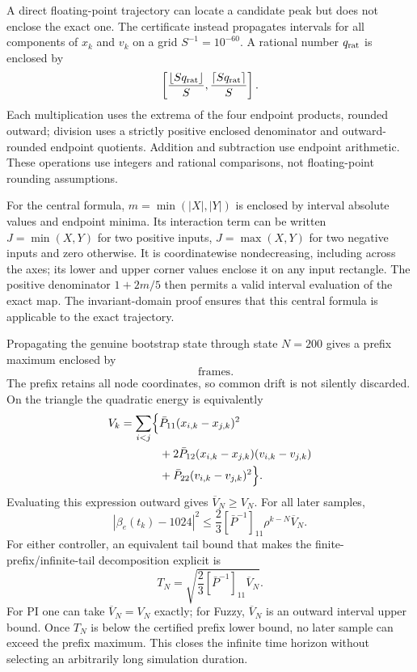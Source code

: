 A direct floating-point trajectory can locate a candidate peak but does
not enclose the exact one. The certificate instead propagates intervals
for all components of $x_k$ and $v_k$ on a grid $S^{-1}=10^{-60}$.
A rational number $q_{\rm rat}$ is enclosed by
\[
 \left[\frac{\lfloor Sq_{\rm rat}\rfloor}{S},\frac{\lceil Sq_{\rm rat}\rceil}{S}\right].
\]
Each multiplication uses the extrema of the four endpoint products,
rounded outward; division uses a strictly positive enclosed denominator
and outward-rounded endpoint quotients. Addition and subtraction use
endpoint arithmetic. These operations use integers and rational comparisons,
not floating-point rounding assumptions.

For the central formula, $m=\min(|X|,|Y|)$ is enclosed by interval
absolute values and endpoint minima. Its interaction term can be written
$J=\min(X,Y)$ for two positive inputs, $J=\max(X,Y)$ for two negative
inputs and zero otherwise. It is coordinatewise nondecreasing, including
across the axes; its lower and upper corner values enclose it on any
input rectangle. The positive denominator $1+2m/5$ then permits a valid
interval evaluation of the exact map. The invariant-domain proof ensures
that this central formula is applicable to the exact trajectory.

Propagating the genuine bootstrap state through state $N=200$ gives a
prefix maximum enclosed by
\begin{equation}
 [17.314056817962,\;17.314056817963]\quad\text{frames}.
 \label{detail:eq:btd_d_fuzzy_prefix}
\end{equation}
The prefix retains all node coordinates, so common drift is not silently
discarded. On the triangle the quadratic energy is equivalently
\begin{equation}
 \begin{aligned}
 V_k=\sum_{i<j}\Bigl\{&\bar P_{11}(x_{i,k}-x_{j,k})^2\\
 &+2\bar P_{12}(x_{i,k}-x_{j,k})(v_{i,k}-v_{j,k})\\
 &+\bar P_{22}(v_{i,k}-v_{j,k})^2\Bigr\}.
 \end{aligned}
 \label{detail:eq:btd_d_pair_energy}
\end{equation}
Evaluating this expression outward gives $\overline V_N\ge V_N$.
For all later samples,
\begin{equation}
 |\beta_e(t_k)-1024|^2
 \le\frac23[\bar P^{-1}]_{11}\rho^{k-N}\overline V_N.
 \label{detail:eq:btd_d_fuzzy_tail}
\end{equation}
For either controller, an equivalent tail bound that makes the
finite-prefix/infinite-tail decomposition explicit is
\begin{equation}
 T_N=\sqrt{\frac23[\bar P^{-1}]_{11}\overline V_N}.
 \label{detail:eq:btd_tail}
\end{equation}
For PI one can take $\overline V_N=V_N$ exactly; for Fuzzy,
$\overline V_N$ is an outward interval upper bound. Once $T_N$ is below
the certified prefix lower bound, no later sample can exceed the prefix
maximum. This closes the infinite time horizon without selecting an
arbitrarily long simulation duration.


